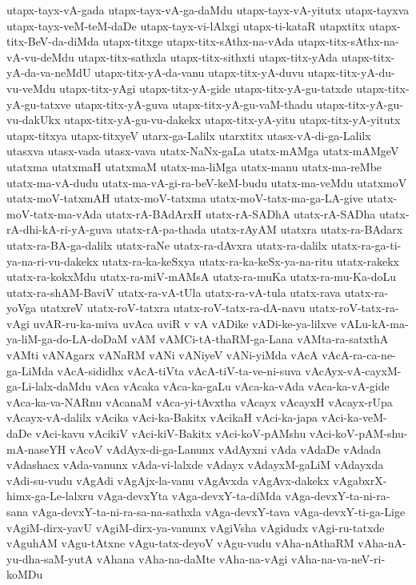 {utapx-tayx-vA-gada
utapx-tayx-vA-ga-daMdu
utapx-tayx-vA-yitutx
utapx-tayxva
utapx-tayx-veM-teM-daDe
utapx-tayx-vi-lAlxgi
utapx-ti-kataR
utapxtitx
utapx-titx-BeV-da-diMda
utapx-titxge
utapx-titx-sAthx-na-vAda
utapx-titx-sAthx-na-vA-vu-deMdu
utapx-titx-sathxla
utapx-titx-sithxti
utapx-titx-yAda
utapx-titx-yA-da-va-neMdU
utapx-titx-yA-da-vanu
utapx-titx-yA-duvu
utapx-titx-yA-du-vu-veMdu
utapx-titx-yAgi
utapx-titx-yA-gide
utapx-titx-yA-gu-tatxde
utapx-titx-yA-gu-tatxve
utapx-titx-yA-guva
utapx-titx-yA-gu-vaM-thadu
utapx-titx-yA-gu-vu-dakUkx
utapx-titx-yA-gu-vu-dakekx
utapx-titx-yA-yitu
utapx-titx-yA-yitutx
utapx-titxya
utapx-titxyeV
utarx-ga-Lalilx
utarxtitx
utasx-vA-di-ga-Lalilx
utasxva
utasx-vada
utasx-vava
utatx-NaNx-gaLa
utatx-mAMga
utatx-mAMgeV
utatxma
utatxmaH
utatxmaM
utatx-ma-liMga
utatx-manu
utatx-ma-reMbe
utatx-ma-vA-dudu
utatx-ma-vA-gi-ra-beV-keM-budu
utatx-ma-veMdu
utatxmoV
utatx-moV-tatxmAH
utatx-moV-tatxma
utatx-moV-tatx-ma-ga-LA-give
utatx-moV-tatx-ma-vAda
utatx-rA-BAdArxH
utatx-rA-SADhA
utatx-rA-SADha
utatx-rA-dhi-kA-ri-yA-guva
utatx-rA-pa-thada
utatx-rAyAM
utatxra
utatx-ra-BAdarx
utatx-ra-BA-ga-dalilx
utatx-raNe
utatx-ra-dAvxra
utatx-ra-dalilx
utatx-ra-ga-ti-ya-na-ri-vu-dakekx
utatx-ra-ka-keSxya
utatx-ra-ka-keSx-ya-na-ritu
utatx-rakekx
utatx-ra-kokxMdu
utatx-ra-miV-mAMsA
utatx-ra-muKa
utatx-ra-mu-Ka-doLu
utatx-ra-shAM-BaviV
utatx-ra-vA-tUla
utatx-ra-vA-tula
utatx-rava
utatx-ra-yoVga
utatxreV
utatx-roV-tatxra
utatx-roV-tatx-ra-dA-navu
utatx-roV-tatx-ra-vAgi
uvAR-ru-ka-miva
uvAca
uviR
v
vA
vADike
vADi-ke-ya-lilxve
vALu-kA-ma-ya-liM-ga-do-LA-doDaM
vAM
vAMCi-tA-thaRM-ga-Lana
vAMta-ra-satxthA
vAMti
vANAgarx
vANaRM
vANi
vANiyeV
vANi-yiMda
vAcA
vAcA-ra-ca-ne-ga-LiMda
vAcA-sididhx
vAcA-tiVta
vAcA-tiV-ta-ve-ni-suva
vAcAyx-vA-cayxM-ga-Li-lalx-daMdu
vAca
vAcaka
vAca-ka-gaLu
vAca-ka-vAda
vAca-ka-vA-gide
vAca-ka-va-NARnu
vAcanaM
vAca-yi-tAvxtha
vAcayx
vAcayxH
vAcayx-rUpa
vAcayx-vA-dalilx
vAcika
vAci-ka-Bakitx
vAcikaH
vAci-ka-japa
vAci-ka-veM-daDe
vAci-kavu
vAcikiV
vAci-kiV-Bakitx
vAci-koV-pAMshu
vAci-koV-pAM-shu-mA-naseYH
vAcoV
vAdAyx-di-ga-Lanunx
vAdAyxni
vAda
vAdaDe
vAdada
vAdashacx
vAda-vanunx
vAda-vi-lalxde
vAdayx
vAdayxM-gaLiM
vAdayxda
vAdi-su-vudu
vAgAdi
vAgAjx-la-vanu
vAgAvxda
vAgAvx-dakekx
vAgabxrX-himx-ga-Le-lalxru
vAga-devxYta
vAga-devxY-ta-diMda
vAga-devxY-ta-ni-ra-sana
vAga-devxY-ta-ni-ra-sa-na-sathxla
vAga-devxY-tava
vAga-devxY-ti-ga-Lige
vAgiM-dirx-yavU
vAgiM-dirx-ya-vanunx
vAgiVsha
vAgidudx
vAgi-ru-tatxde
vAguhAM
vAgu-tAtxne
vAgu-tatx-deyoV
vAgu-vudu
vAha-nAthaRM
vAha-nA-yu-dha-saM-yutA
vAhana
vAha-na-daMte
vAha-na-vAgi
vAha-na-va-neV-ri-koMDu
}

